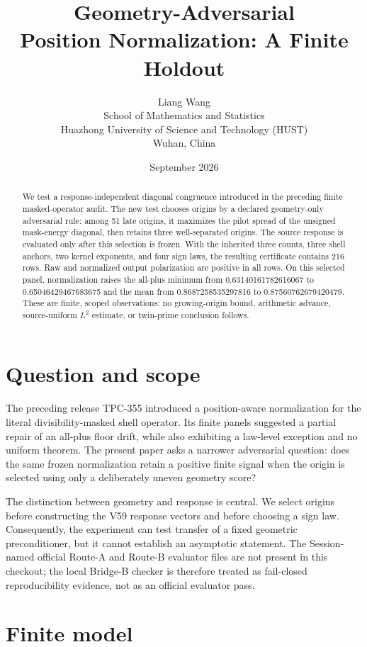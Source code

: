 \documentclass[10pt]{article}
\title{Geometry-Adversarial\\
Position Normalization: A Finite Holdout}
\author{Liang Wang\\
\small School of Mathematics and Statistics\\
\small Huazhong University of Science and Technology (HUST)\\
\small Wuhan, China}
\date{September 2026}
\begin{document}
\maketitle

\begin{abstract}
We test a response-independent diagonal congruence introduced in the
preceding finite masked-operator audit.  The new test chooses origins by a
declared geometry-only adversarial rule: among 51 late origins, it maximizes
the pilot spread of the unsigned mask-energy diagonal, then retains three
well-separated origins.  The source response is evaluated only after this
selection is frozen.  With the inherited three counts, three shell anchors,
two kernel exponents, and four sign laws, the resulting certificate contains
216 rows.  Raw and normalized output polarization are positive in all rows.
On this selected panel, normalization raises the all-plus minimum from
0.63140161782616067 to 0.65046429467683675 and the mean from
0.8687258535297816 to 0.87560762679420479.  These are finite, scoped
observations: no growing-origin bound, arithmetic advance, source-uniform
$L^2$ estimate, or twin-prime conclusion follows.
\end{abstract}

\section{Question and scope}

The preceding release TPC-355 introduced a position-aware normalization for
the literal divisibility-masked shell operator.  Its finite panels suggested
a partial repair of an all-plus floor drift, while also exhibiting a law-level
exception and no uniform theorem.  The present paper asks a narrower
adversarial question: does the same frozen normalization retain a positive
finite signal when the origin is selected using only a deliberately uneven
geometry score?

The distinction between geometry and response is central.  We select origins
before constructing the V59 response vectors and before choosing a sign law.
Consequently, the experiment can test transfer of a fixed geometric
preconditioner, but it cannot establish an asymptotic statement.  The
Session-named official Route-A and Route-B evaluator files are not present in
this checkout; the local Bridge-B checker is therefore treated as fail-closed
reproducibility evidence, not as an official evaluator pass.

\section{Finite model}
\end{document}
